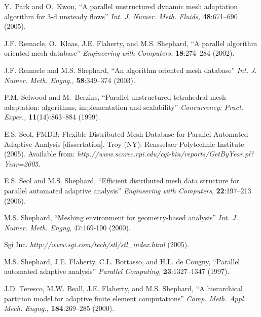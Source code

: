 \begin{thebibliography}{99}

Y.~Park and O.~Kwon, ``A parallel unstructured dynamic mesh adaptation algorithm for 3-d
  unsteady flows'' {\it Int. J. Numer. Meth. Fluids,} {\bf 48}:671--690 (2005).

J.F. Remacle, O.~Klaas, J.E. Flaherty, and M.S. Shephard, ``A parallel algorithm oriented mesh database'' {\it Engineering with Computers,} {\bf 18}:274--284 (2002).

J.F. Remacle and M.S. Shephard, ``An algorithm oriented mesh database'' {\it Int. J. Numer. Meth. Engng.,} {\bf 58}:349--374 (2003).


P.M. Selwood and M.~Berzins, ``Parallel unstructured tetrahedral mesh adaptation: algorithms,
  implementation and scalability'' {\it Concurrency: Pract. Exper.,} {\bf 11}(14):863--884 (1999).

E.S. Seol, FMDB: Flexible Distributed Mesh Database for Parallel Automated Adaptive Analysis [dissertation]. Troy (NY): Rensselaer Polytechnic Institute (2005). Available from: {\it http://www.scorec.rpi.edu/cgi-bin/reports/GetByYear.pl?Year=2005}.

E.S. Seol and M.S. Shephard, ``Efficient distributed mesh data structure for parallel automated
  adaptive analysis'' {\it Engineering with Computers}, {\bf 22}:197--213 (2006).

M.S. Shephard, ``Meshing environment for
geometry-based analysis'' {\it Int. J. Numer. Meth. Engng}, 47:169-190 (2000).

 Sgi Inc. {\it http://www.sgi.com/tech/stl/stl\_index.html} (2005).

 M.S. Shephard, J.E. Flaherty, C.L. Bottasso, and H.L. de Cougny, ``Parallel automated adaptive analysis'' {\it Parallel Computing,} {\bf 23}:1327--1347 (1997).

J.D. Teresco, M.W. Beall, J.E. Flaherty, and M.S. Shephard, ``A hierarchical partition model for adaptive finite element computations'' {\it Comp. Meth. Appl. Mech. Engng.,} {\bf 184}:269--285 (2000).



\end{thebibliography}
